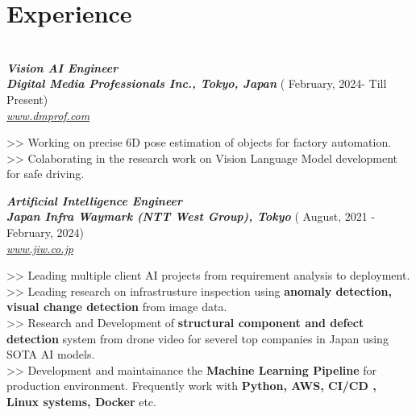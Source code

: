 \documentclass[letterpaper]{twentysecondcv} %
\begin{document}
\makeprofile %

\section{Experience}\\


{\bfseries \itshape \color{gray} Vision AI Engineer} \\
\textbf{\itshape \color{mainblue} Digital Media Professionals Inc., Tokyo, Japan }{\color{golden}  ( February, 2024- Till Present) }\\
{ \href {https://www.dmprof.com}{\itshape \color{blue} www.dmprof.com}}

\begin{multiline}
>> Working on precise 6D pose estimation of objects for factory automation.\\
>> Colaborating in the research work on Vision Language Model development for safe driving.
\end{multiline}

{\bfseries \itshape \color{gray} Artificial Intelligence Engineer} \\
\textbf{\itshape \color{mainblue} Japan Infra Waymark (NTT West Group), Tokyo }{\color{golden}  ( August, 2021 - February, 2024) }\\
{ \href {https://www.jiw.co.jp}{\itshape \color{blue} www.jiw.co.jp}}

\begin{multiline}
>> Leading multiple client AI  projects from requirement analysis to deployment. \\
>> Leading research on infrastrusture inspection using \textbf{anomaly detection, visual change detection} from image data.\\
>> Research and Development of \textbf{structural component and defect detection} system from drone video for severel top companies in Japan using SOTA AI models. \\
>> Development and maintainance the \textbf{Machine Learning Pipeline} for production environment. Frequently work with \textbf{Python, AWS, CI/CD , Linux systems, Docker} etc.
\end{multiline}
\end{document}
